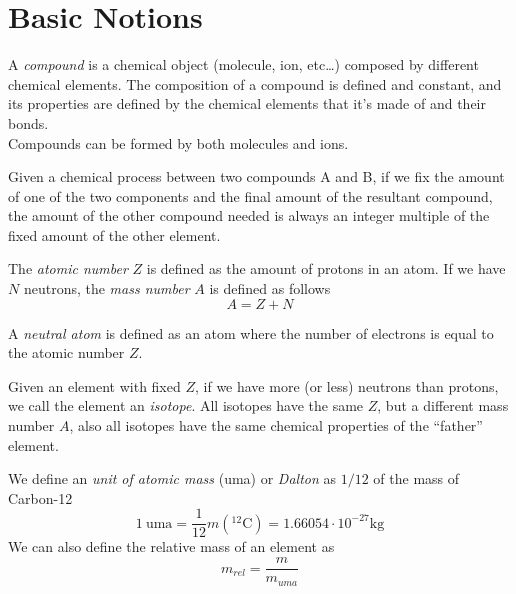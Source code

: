 \documentclass[../qm.tex]{subfiles}
\begin{document}
\section{Basic Notions}
\begin{dfn}[Compound]
	A \emph{compound} is a chemical object (molecule, ion, etc\ldots) composed by different chemical elements. The composition of a compound is defined and constant, and its properties are defined by the chemical elements that it's made of and their bonds.\\
	Compounds can be formed by both molecules and ions.
\end{dfn}
\begin{thm}[Dalton]
	Given a chemical process between two compounds A and B, if we fix the amount of one of the two components and the final amount of the resultant compound, the amount of the other compound needed is always an integer multiple of the fixed amount of the other element.
\end{thm}
\begin{dfn}
	The \emph{atomic number} $Z$ is defined as the amount of protons in an atom. If we have $N$ neutrons, the \emph{mass number} $A$ is defined as follows
	\begin{equation}
		A=Z+N
		\label{eq:massnumber.chem}
	\end{equation}
\end{dfn}
\begin{dfn}
	A \emph{neutral atom} is defined as an atom where the number of electrons is equal to the atomic number $Z$.
\end{dfn}
\begin{dfn}[Isotope]
	Given an element with fixed $Z$, if we have more (or less) neutrons than protons, we call the element an \emph{isotope}. All isotopes have the same $Z$, but a different mass number $A$, also all isotopes have the same chemical properties of the ``father'' element.
\end{dfn}
\begin{dfn}
	We define an \emph{unit of atomic mass} (uma) or \emph{Dalton} as $1/12$ of the mass of Carbon-12
	\begin{equation}
		1\ \mathrm{uma}=\frac{1}{12}m\left( \mathrm{ {}^{12}C} \right)=1.66054\cdot10^{-27}\mathrm{kg}
		\label{eq:dalton.chem}
	\end{equation}
	We can also define the relative mass of an element as
	\begin{equation}
		m_{rel}=\frac{m}{m_{uma}}
		\label{eq:relmass.chem}
	\end{equation}
\end{dfn}
\end{document}
